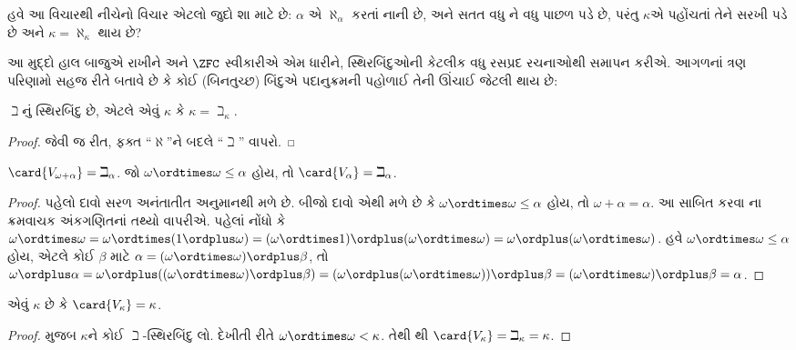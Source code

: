હવે આ વિચારથી નીચેનો વિચાર એટલો જુદો શા માટે
છે: $\alpha$ એ $\aleph_\alpha$ કરતાં નાની છે,
અને સતત વધુ ને વધુ પાછળ પડે છે, પરંતુ
$\kappa$એ પહોંચતાં તેને સરખી પડે છે અને
$\kappa = \aleph_\kappa$ થાય છે?

આ મુદ્દો હાલ બાજુએ રાખીને અને $\ZFC$ સ્વીકારીએ
એમ ધારીને, સ્થિરબિંદુઓની કેટલીક વધુ રસપ્રદ
રચનાઓથી સમાપન કરીએ. આગળનાં ત્રણ પરિણામો સહજ
રીતે બતાવે છે કે કોઈ (બિનતુચ્છ) બિંદુએ પદાનુક્રમની
પહોળાઈ તેની ઊંચાઈ જેટલી થાય છે:

\begin{prop}
$\beth$નું સ્થિરબિંદુ છે, એટલે એવું $\kappa$ કે
$\kappa=\beth_\kappa$.
\end{prop}

\begin{proof}
 જેવી જ રીત, ફક્ત ``$\aleph$''ને
બદલે ``$\beth$'' વાપરો.
\end{proof}

\begin{prop}
$\card{V_{\omega+\alpha}} = \beth_{\alpha}$.
જો $\omega \ordtimes \omega \leq \alpha$ હોય, તો
$\card{V_\alpha} = \beth_\alpha$.
\end{prop}

\begin{proof}
પહેલો દાવો સરળ અનંતાતીત અનુમાનથી મળે છે. બીજો
દાવો એથી મળે છે કે $\omega \ordtimes \omega
\leq \alpha$ હોય, તો $\omega + \alpha = \alpha$.
આ સાબિત કરવા
ના ક્રમવાચક અંકગણિતનાં
તથ્યો વાપરીએ. પહેલાં નોંધો કે
$\omega \ordtimes \omega = \omega \ordtimes (1 \ordplus \omega) =
(\omega  \ordtimes 1) \ordplus (\omega\ordtimes\omega) = \omega
\ordplus (\omega \ordtimes \omega)$.
હવે $\omega \ordtimes \omega \leq \alpha$
હોય, એટલે કોઈ $\beta$ માટે
$\alpha = (\omega\ordtimes\omega) \ordplus \beta$,
તો $\omega \ordplus \alpha = \omega \ordplus
((\omega \ordtimes \omega) \ordplus \beta) =
(\omega \ordplus (\omega \ordtimes \omega)) \ordplus
\beta = (\omega \ordtimes \omega) \ordplus
\beta = \alpha$.
\end{proof}

\begin{cor}
એવું $\kappa$ છે કે $\card{V_\kappa} = \kappa$.
\end{cor}

\begin{proof}
 મુજબ $\kappa$ને કોઈ
$\beth$-સ્થિરબિંદુ લો. દેખીતી રીતે
$\omega \ordtimes \omega < \kappa$.
તેથી થી
$\card{V_\kappa} = \beth_\kappa= \kappa$.
\end{proof}

